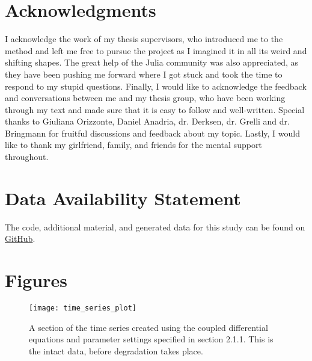 \documentclass[utf8]{FrontiersinVancouver}
\begin{document}
\section*{Acknowledgments}
I acknowledge the work of my thesis supervisors, who introduced me to the method and left me free to pursue the project as I imagined it in all its weird and shifting shapes.  The great help of the Julia community was also appreciated, as they have been pushing me forward where I got stuck and took the time to respond to my stupid questions. Finally, I would like to acknowledge the feedback and conversations between me and my thesis group, who have been working through my text and made sure that it is easy to follow and well-written. Special thanks to Giuliana Orizzonte, Daniel Anadria, dr. Derksen, dr. Grelli and dr. Bringmann for fruitful discussions and feedback about my topic. Lastly, I would like to thank my girlfriend, family, and friends for the mental support throughout.

\section*{Data Availability Statement}
The code, additional material, and generated data for this study can be found on \href{https://github.com/MvanSteenbergen/MasterThesisRQA}{GitHub}.


\newpage

\newpage
\section*{Figures}
\begin{figure}[H]
    \begin{center}
    \texttt{[image: time\_series\_plot]}
    \end{center}
    \caption{A section of the time series created using the coupled differential equations and parameter settings specified in section 2.1.1. This is the intact data, before degradation takes place.}\label{fig:1}
    \end{figure}
\end{document}
